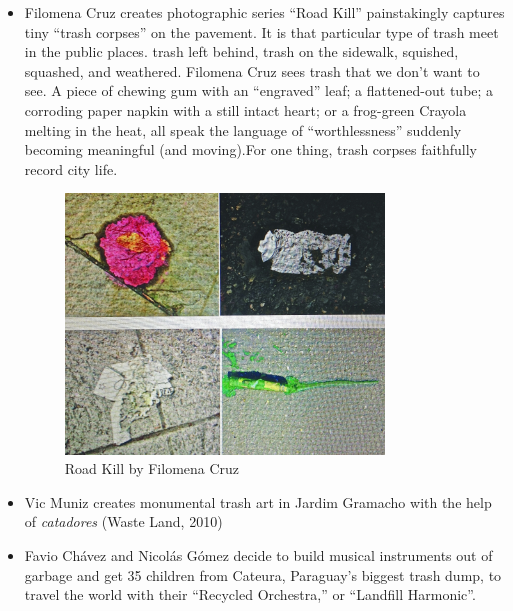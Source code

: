 \documentclass[12pt]{article}
\begin{document}
\begin{itemize}
\item Filomena Cruz creates photographic series “Road Kill” painstakingly captures tiny “trash corpses” on the pavement. It is that particular type of trash meet in the public places. trash left behind, trash on the sidewalk, squished, squashed, and weathered. Filomena Cruz sees trash that we don’t want to see. A
piece of chewing gum with an “engraved” leaf; a flattened-out tube; a corroding paper napkin with a still intact heart; or a frog-green Crayola melting in the heat, all speak the language of “worthlessness” suddenly becoming meaningful (and moving).For one thing, trash corpses faithfully record city life. 
  \begin{figure}[ht]
      \centering
      \includegraphics[width=0.8\textwidth]{graphics/FilomenaCruz_RoadKill_ReVista.jpg}
      \caption{Road Kill by Filomena Cruz}
      \label{fig:FilomenaCruz_RoadKill_ReVista}
  \end{figure}

\item Vic Muniz creates monumental trash art in Jardim Gramacho with the help of \textit{catadores} (Waste Land, 2010)

\item Favio Chávez and Nicolás Gómez decide to build musical instruments out of garbage and get 35 children from Cateura, Paraguay’s biggest trash dump, to travel the world with their “Recycled Orchestra,” or “Landfill Harmonic”.


\end{itemize}
\end{document}
